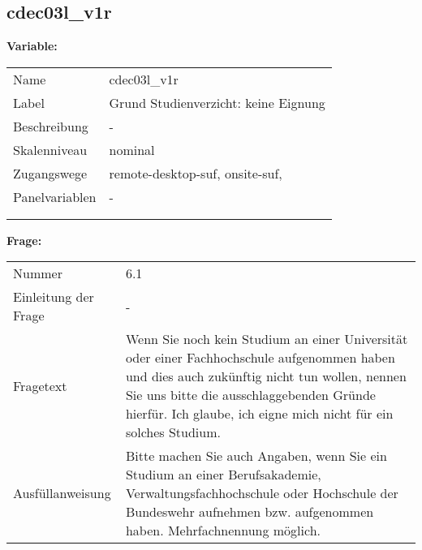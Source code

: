 	
	
	\subsection{cdec03l\_v1r}
	\label{subSection:cdec03l_v1r}

	\noindent\textbf{Variable:}\\
		\begin{tabular}{lL{11.3cm}}
			\label{tableVariable:cdec03l_v1r}
			Name & cdec03l\_v1r \\
			Label & Grund Studienverzicht: keine Eignung  \\
			Beschreibung & - \\
			Skalenniveau & nominal \\
			Zugangswege &
				remote-desktop-suf,
				onsite-suf,
 \\
			Panelvariablen & -
			 \\
			 \\
 \\
		\end{tabular}

		\vspace*{1 cm}
		\noindent\textbf{Frage:}\\
		\begin{tabular}{lL{11.3cm}}
			\label{tableQuestion:cdec03l_v1r}
			Nummer & 6.1 \\
			Einleitung der Frage & - \\
			Fragetext & Wenn Sie noch kein Studium an einer Universität oder einer Fachhochschule aufgenommen haben und dies auch zukünftig nicht tun wollen, nennen Sie uns bitte die ausschlaggebenden Gründe hierfür.
Ich glaube, ich eigne mich nicht für ein solches Studium. \\
			Ausfüllanweisung & Bitte machen Sie auch Angaben, wenn Sie ein Studium an einer Berufsakademie, Verwaltungsfachhochschule oder Hochschule der Bundeswehr aufnehmen bzw. aufgenommen haben. Mehrfachnennung möglich. \\
		\end{tabular}





